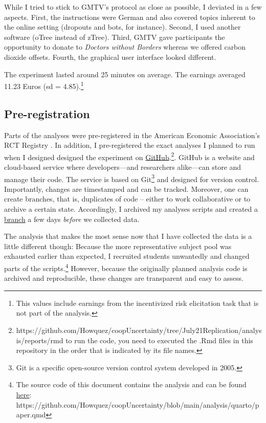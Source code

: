 \documentclass[
  authoryear,
  preprint,
  3p]{elsarticle}
\begin{document}
While I tried to stick to GMTV's protocol as close as possible, I
deviated in a few aspects. First, the instructions were German and also
covered topics inherent to the online setting (dropouts and bots, for
instance). Second, I used another software (oTree instead of zTree).
Third, GMTV gave participants the opportunity to donate to \emph{Doctors
without Borders} whereas we offered carbon dioxide offsets. Fourth, the
graphical user interface looked different.

The experiment lasted around 25 minutes on average. The earnings
averaged 11.23 Euros (sd = 4.85).\footnote{This values include earnings
  from the incentivized risk elicitation task that is not part of the
  analysis.}

\hypertarget{sec-registration}{%
\subsection{Pre-registration}\label{sec-registration}}

Parts of the analyses were pre-registered in the American Economic
Association's RCT Registry \citep{preregistration}. In addition, I
pre-registered the exact analyses I planned to run when I designed
designed the experiment on
\href{https://github.com/Howquez/coopUncertainty/blob/July21Replication/analysis/reports/rmd}{GitHub}.\footnote{https://github.com/Howquez/coopUncertainty/tree/July21Replication/analysis/reports/rmd
  to run the code, you need to executed the .Rmd files in this
  repository in the order that is indicated by its file names.}. GitHub
is a website and cloud-based service where developers---and researchers
alike---can store and manage their code. The service is based on
Git\footnote{Git is a specific open-source version control system
  developed in 2005.} and designed for version control. Importantly,
changes are timestamped and can be tracked. Moreover, one can create
branches, that is, duplicates of code -- either to work collaborative or
to archive a certain state. Accordingly, I archived my analyses scripts
and created a
\href{https://github.com/Howquez/coopUncertainty/tree/July21Replication}{branch}
a few days \emph{before} we collected data.

The analysis that makes the most sense now that I have collected the
data is a little different though: Because the more representative
subject pool was exhausted earlier than expected, I recruited students
unwantedly and changed parts of the scripts.\footnote{The source code of
  this document contains the analysis and can be found
  \href{https://github.com/Howquez/coopUncertainty/blob/main/analysis/quarto/paper.qmd}{here}:
  https://github.com/Howquez/coopUncertainty/blob/main/analysis/quarto/paper.qmd}
However, because the originally planned analysis code is archived and
reproducible, these changes are transparent and easy to assess.
\end{document}
